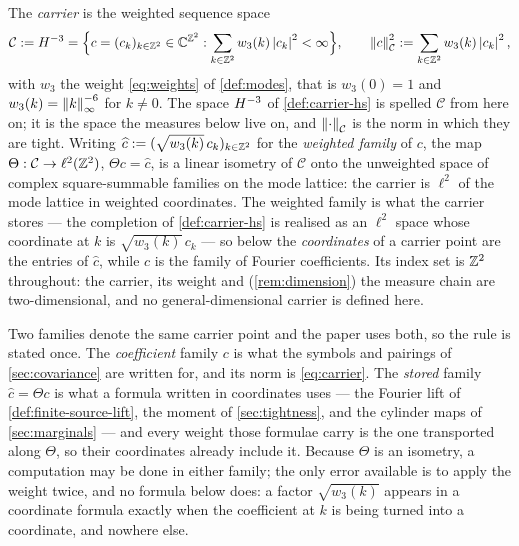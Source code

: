 \begin{definition}\label{def:carrier-hminus3}
The \emph{carrier} is the weighted sequence space
\begin{equation}\label{eq:carrier}
  \mathcal C:=H^{-3}
  =\Bigl\{c=(c_k)_{k\in\mathbb{Z}^2}\in\mathbb{C}^{\mathbb{Z}^2}:
  \sum_{k\in\mathbb{Z}^2}w_3(k)\left| c_k \right|^2<\infty\Bigr\},
  \qquad
  \left\| c \right\|_{\mathcal C}^2:=\sum_{k\in\mathbb{Z}^2}w_3(k)\left| c_k \right|^2 ,
\end{equation}
with $w_3$ the weight \eqref{eq:weights} of \cref{def:modes}, that is
$w_3(0)=1$ and $w_3(k)=\left\| k \right\|_\infty^{-6}$ for $k\neq0$. The space $H^{-3}$
of \cref{def:carrier-hs} is spelled $\mathcal C$ from here on; it is the space
the measures below live on, and $\left\| \cdot \right\|_{\mathcal C}$ is the norm in which
they are tight. Writing $\widehat c:=(\sqrt{w_3(k)}\,c_k)_{k\in\mathbb{Z}^2}$ for the
\emph{weighted family} of $c$, the map
$\Theta:\mathcal C\to\ell^2(\mathbb{Z}^2)$, $\Theta c=\widehat c$, is a linear isometry
of $\mathcal C$ onto the unweighted space of complex square-summable families on
the mode lattice: the carrier is $\ell^2$ of the mode lattice in weighted
coordinates. The weighted family is what the carrier stores --- the completion
of \cref{def:carrier-hs} is realised as an $\ell^2$ space whose coordinate at
$k$ is $\sqrt{w_3(k)}\,c_k$ --- so below the \emph{coordinates} of a carrier
point are the entries of $\widehat c$, while $c$ is the family of Fourier
coefficients. Its index set is $\mathbb{Z}^2$ throughout: the carrier, its weight and
(\cref{rem:dimension}) the measure chain are two-dimensional, and no
general-dimensional carrier is defined here.
\end{definition}

\begin{remark}\label{rem:two-families}
Two families denote the same carrier point and the paper uses both, so the rule
is stated once. The \emph{coefficient} family $c$ is what the symbols and
pairings of \cref{sec:covariance} are written for, and its norm is
\eqref{eq:carrier}. The \emph{stored} family $\widehat c=\Theta c$ is what a
formula written in coordinates uses --- the Fourier lift of
\cref{def:finite-source-lift}, the moment of \cref{sec:tightness}, and the
cylinder maps of \cref{sec:marginals} --- and every weight those formulae carry is
the one transported along $\Theta$, so their coordinates already include it.
Because $\Theta$ is an isometry, a computation may be done in either family; the
only error available is to apply the weight twice, and no formula below does:
a factor $\sqrt{w_3(k)}$ appears in a coordinate formula exactly when the
coefficient at $k$ is being turned into a coordinate, and nowhere else.
\end{remark}

